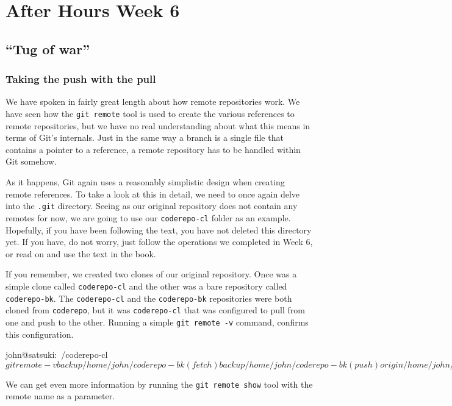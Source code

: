 \chapter{After Hours Week 6}
\section{``Tug of war''}
\subsection{Taking the push with the pull}
We have spoken in fairly great length about how remote repositories work.
We have seen how the \texttt{git remote} tool is used to create the various references to remote repositories, but we have no real understanding about what this means in terms of Git's internals.
Just in the same way a branch is a single file that contains a pointer to a reference, a remote repository has to be handled within Git somehow.

As it happens, Git again uses a reasonably simplistic design when creating remote references.
To take a look at this in detail, we need to once again delve into the \texttt{.git} directory.
Seeing as our original repository does not contain any remotes for now, we are going to use our \texttt{coderepo-cl} folder as an example.
Hopefully, if you have been following the text, you have not deleted this directory yet.
If you have, do not worry, just follow the operations we completed in Week 6, or read on and use the text in the book.

If you remember, we created two clones of our original repository.
Once was a simple clone called \texttt{coderepo-cl} and the other was a bare repository called \texttt{coderepo-bk}.
The \texttt{coderepo-cl} and the \texttt{coderepo-bk} repositories were both cloned from \texttt{coderepo}, but it was \texttt{coderepo-cl} that was configured to pull from one and push to the other.
Running a simple \texttt{git remote -v} command, confirms this configuration.

\begin{code}
john@satsuki:~/coderepo-cl$ git remote -v
backup	/home/john/coderepo-bk (fetch)
backup	/home/john/coderepo-bk (push)
origin	/home/john/coderepo (fetch)
origin	/home/john/coderepo (push)
john@satsuki:~/coderepo-cl$
\end{code}

We can get even more information by running the \texttt{git remote show} tool with the remote name as a parameter.

